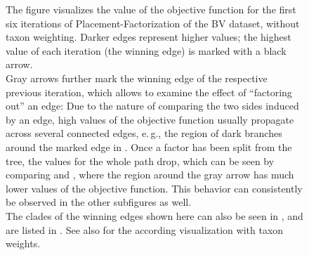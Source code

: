 \begin{figure}[!htbp]
{        The figure visualizes the value of the objective function for the first six iterations of
        Placement-Factorization of the \ac{BV} dataset, without taxon weighting.
        Darker edges represent higher values;
        the highest value of each iteration (the winning edge) is marked with a black arrow.
        \\
        Gray arrows further mark the winning edge of the respective previous iteration,
        which allows to examine the effect of ``factoring out'' an edge:
        Due to the nature of comparing the two sides induced by an edge,
        high values of the objective function usually propagate across several connected edges,
        e.\,g., the region of dark branches around the marked edge in .
        Once a factor has been split from the tree, the values for the whole path drop,
        which can be seen by comparing 
        and ,
        where the region around the gray arrow has much lower values of the objective function.
        This behavior can consistently be observed in the other subfigures as well.
        \\
        The clades of the winning edges shown here can also be seen in ,
        and are listed in .
        See also  for the according visualization with taxon weights.
    }
    \label{fig:pf_bv_place_no_tw_ovs}
\end{figure}


